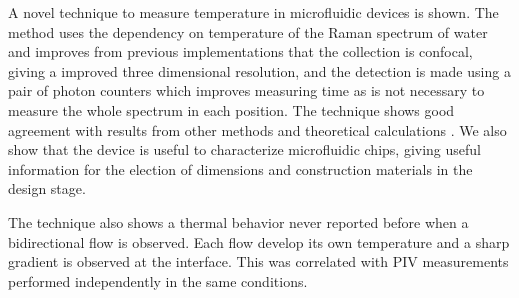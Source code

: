 \documentclass[]{spie}  %
\begin{document}
A novel technique to measure temperature in microfluidic devices is shown. The method uses the dependency on temperature of the Raman spectrum of water and improves from previous implementations that the collection is confocal, giving a improved three dimensional resolution, and the detection is made using a pair of photon counters which improves measuring time as is not necessary to measure the whole spectrum in each position. The technique shows good agreement with results from other methods and theoretical calculations \cite{erickson2003}. We also show that the device is useful to characterize microfluidic chips, giving useful information for the election of dimensions and construction materials in the design stage. 

The technique also shows a thermal behavior never reported before when a bidirectional flow is observed. Each flow develop its own temperature and a sharp gradient is observed at the interface. This was correlated with PIV measurements performed independently in the same conditions.


\end{document}
